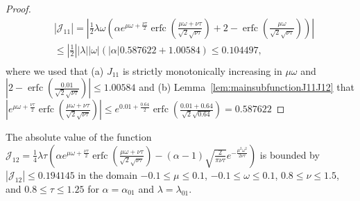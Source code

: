 \documentclass{article}
\renewcommand{\leq}{\leqslant}
\DeclareMathOperator{\erfc}{erfc}
\begin{document}
\begin{proof}
\begin{align}
& \left|\mathcal J_{11} \right| = \left| \frac{1}{2} \lambda  \omega \left( 
	\alpha  e^{\mu \omega+\frac{\nu \tau}{2}} \erfc \left(\frac{\mu \omega + \nu \tau}{\sqrt{2} \sqrt{\nu \tau}}\right) + 
	2 - \erfc\left(\frac{\mu \omega}{\sqrt{2} \sqrt{\nu \tau}}\right)\right) \right| \nonumber \\
& \leq |\frac{1}{2}| |\lambda| |\omega| \left( |\alpha| 0.587622 + 1.00584 \right) \leq 0.104497, \nonumber \\
\end{align}
where we used that (a) $J_{11}$ is strictly monotonically increasing in $\mu \omega$ and $|2-\erfc\left(\frac{0.01}{\sqrt{2} \sqrt{\nu \tau}}\right)| \leq 1.00584$
and (b) Lemma~\ref{lem:mainsubfunctionJ11J12} that 
$| e^{\mu \omega+\frac{\nu \tau}{2}} \erfc \left(\frac{\mu \omega + \nu \tau}{\sqrt{2} \sqrt{\nu \tau}}\right)| \leq e^{0.01 +\frac{0.64}{2}} \erfc \left(\frac{0.01 + 0.64}{\sqrt{2} \sqrt{0.64}}\right)=0.587622$
\end{proof}


\begin{lemma}[Bound on J12]
\label{lem:J12}
The absolute value of the function \\ 
$\mathcal J_{12} = 
\frac{1}{4} \lambda  \tau \left(\alpha e^{\mu \omega+\frac{\nu \tau}{2}} 
\erfc \left(\frac{\mu \omega+\nu \tau}{\sqrt{2} \sqrt{\nu \tau}}\right)-(\alpha -1) \sqrt{\frac{2}{\pi  \nu \tau}} e^{-\frac{\mu^2\omega^2}{2 \nu \tau}}\right)$ is bounded by 
$\left|\mathcal J_{12} \right| \leq 0.194145$ in the domain $-0.1 \leq \mu \leq 0.1$, $-0.1 \leq \omega \leq 0.1$, $0.8 \leq \nu \leq 1.5$, 
and $0.8 \leq \tau \leq 1.25$ for $\alpha=\alpha_{\mathrm{01}}$ and $\lambda=\lambda_{\mathrm{01}}$.
\end{lemma}
\end{document}
